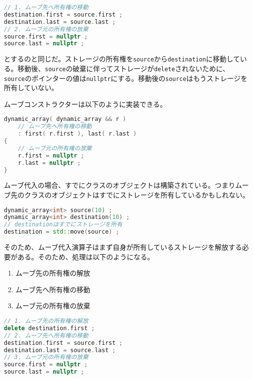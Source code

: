\begin{lstlisting}[language={C++}]
// 1. ムーブ先へ所有権の移動
destination.first = source.first ;
destination.last = source.last ;
// 2. ムーブ元の所有権の放棄
source.first = nullptr ;
source.last = nullptr ;
\end{lstlisting}
とするのと同じだ。ストレージの所有権を\texttt{source}から\texttt{destination}に移動している。移動後、\texttt{source}の破棄に伴ってストレージが\texttt{delete}されないために、\texttt{source}のポインターの値は\texttt{nullptr}にする。移動後の\texttt{source}はもうストレージを所有していない。


ムーブコンストラクターは以下のように実装できる。

\begin{lstlisting}[language={C++}]
dynamic_array( dynamic_array && r )
    // ムーブ先へ所有権の移動
    : first( r.first ), last( r.last )
{
    // ムーブ元の所有権の放棄
    r.first = nullptr ;
    r.last = nullptr ;
}
\end{lstlisting}


ムーブ代入の場合、すでにクラスのオブジェクトは構築されている。つまりムーブ先のクラスのオブジェクトはすでにストレージを所有しているかもしれない。

\begin{lstlisting}[language={C++}]
dynamic_array<int> source(10) ;
dynamic_array<int> destination(10) ;
// destinationはすでにストレージを所有
destination = std::move(source) ;
\end{lstlisting}

そのため、ムーブ代入演算子はまず自身が所有しているストレージを解放する必要がある。そのため、処理は以下のようになる。

\begin{enumerate}
\def\labelenumi{\arabic{enumi}.}
\item
  ムーブ先の所有権の解放
\item
  ムーブ先へ所有権の移動
\item
  ムーブ元の所有権の放棄
\end{enumerate}

\begin{lstlisting}[language={C++}]
// 1. ムーブ先の所有権の解放
delete destination.first ;
// 2. ムーブ先へ所有権の移動
destination.first = source.first ;
destination.last = source.last ;
// 3. ムーブ元の所有権の放棄
source.first = nullptr ;
source.last = nullptr ;
\end{lstlisting}

